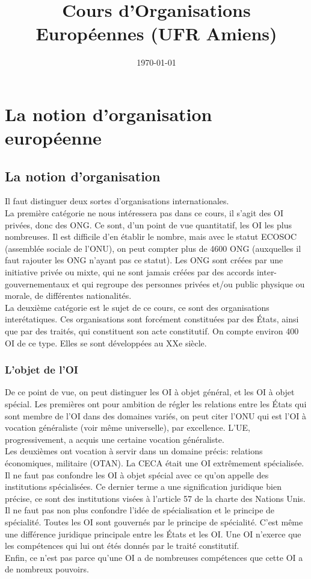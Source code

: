 \documentclass[10pt, a4paper, openany]{book}
\date{\today}
\title{Cours d'Organisations Européennes (UFR Amiens)}
\begin{document}
\maketitle
\tableofcontents


\chapter{La notion d'organisation européenne}

\section{La notion d'organisation}

Il faut distinguer deux sortes d'organisations internationales. \\
La première catégorie ne nous intéressera pas dans ce cours, il s'agit des OI privées, donc des ONG. Ce sont, d'un point de vue quantitatif, les OI les plus nombreuses. Il est difficile d'en établir le nombre, mais avec le statut ECOSOC (assemblée sociale de l'ONU), on peut compter plus de 4600 ONG (auxquelles il faut rajouter les ONG n'ayant pas ce statut). Les ONG sont créées par une initiative privée ou mixte, qui ne sont jamais créées par des accords inter-gouvernementaux et qui regroupe des personnes privées et/ou public physique ou morale, de différentes nationalités. \\
La deuxième catégorie est le sujet de ce cours, ce sont des organisations interétatiques. Ces organisations sont forcément constituées par des États, ainsi que par des traités, qui constituent son acte constitutif. On compte environ 400 OI de ce type. Elles se sont développées au XXe siècle. 

\subsection{L'objet de l'OI}

De ce point de vue, on peut distinguer les OI à objet général, et les OI à objet spécial. Les premières ont pour ambition de régler les relations entre les États qui sont membre de l'OI dans des domaines variés, on peut citer l'ONU qui est l'OI à vocation généraliste (voir même universelle), par excellence. L'UE, progressivement, a acquis une certaine vocation généraliste. \\
Les deuxièmes ont vocation à servir dans un domaine précis: relations économiques, militaire (OTAN). La CECA était une OI extrêmement spécialisée. \\
Il ne faut pas confondre les OI à objet spécial avec ce qu'on appelle des institutions spécialisées. Ce dernier terme a une signification juridique bien précise, ce sont des institutions visées à l'article 57 de la charte des Nations Unis. \\
Il ne faut pas non plus confondre l'idée de spécialisation et le principe de spécialité. Toutes les OI sont gouvernés par le principe de spécialité. C'est même une différence juridique principale entre les États et les OI. Une OI n'exerce que les compétences qui lui ont étés donnés par le traité constitutif. \\
Enfin, ce n'est pas parce qu'une OI a de nombreuses compétences que cette OI a de nombreux pouvoirs. 
\end{document}
